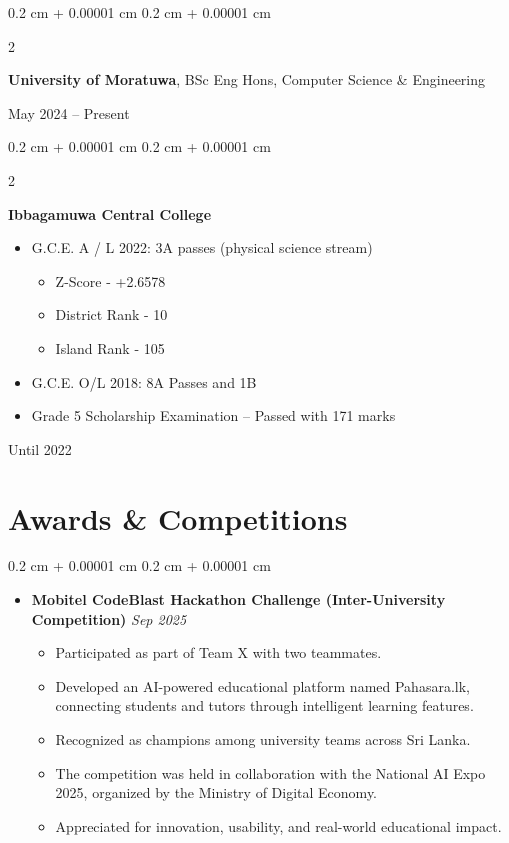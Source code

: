 \documentclass[10pt, letterpaper]{article}
\newenvironment{highlights}{
	\begin{itemize}[
		topsep=0.10 cm,
		parsep=0.10 cm,
		partopsep=0pt,
		itemsep=0pt,
		leftmargin=0.4 cm + 10pt
		]
	}{
	\end{itemize}
} %
\newenvironment{highlightsforbulletentries}{
	\begin{itemize}[
		topsep=0.10 cm,
		parsep=0.10 cm,
		partopsep=0pt,
		itemsep=0pt,
		leftmargin=10pt
		]
	}{
	\end{itemize}
} %
\newenvironment{onecolentry}{
	\begin{adjustwidth}{
			0.2 cm + 0.00001 cm
		}{
			0.2 cm + 0.00001 cm
		}
	}{
	\end{adjustwidth}
} %
\newenvironment{twocolentry}[2][]{
	\onecolentry
	\def\secondColumn{#2}
	\setcolumnwidth{\fill, 4.5 cm}
	\begin{paracol}{2}
	}{
		\switchcolumn \raggedleft \secondColumn
	\end{paracol}
	\endonecolentry
} %
\begin{document}
	
	
	
	\begin{twocolentry}{
			May 2024 – Present
		}
		\textbf{University of Moratuwa}, BSc Eng Hons, Computer Science \& Engineering
		
		
		
	\end{twocolentry}
	
	
	
	\vspace{0.2 cm}
	\begin{twocolentry}{
			Until 2022
		}
		\textbf{Ibbagamuwa Central College }
		
		\begin{highlights}
			
			\item G.C.E. A / L 2022: 3A passes (physical science stream)  \begin{itemize}
				\item Z-Score - +2.6578
				\item District Rank - 10
				\item Island Rank - 105
			\end{itemize}
			
			\item G.C.E. O/L 2018: 8A Passes and 1B
			\item Grade 5 Scholarship Examination – Passed with 171 marks
		\end{highlights} 
	\end{twocolentry}
	
	
\section{Awards \& Competitions}

\begin{onecolentry}
	
	\begin{highlightsforbulletentries}
		
		\item \textbf{Mobitel CodeBlast Hackathon Challenge (Inter-University Competition)} \hfill \textit{Sep 2025}
\begin{itemize}
	\item Participated as part of Team X with two teammates.
	\item Developed an AI-powered educational platform named Pahasara.lk, connecting students and tutors through intelligent learning features.
	\item Recognized as champions among university teams across Sri Lanka.
	\item The competition was held in collaboration with the National AI Expo 2025, organized by the Ministry of Digital Economy.
	\item Appreciated for innovation, usability, and real-world educational impact.
\end{itemize}

		
	\end{highlightsforbulletentries}
	
\end{onecolentry}
\end{document}
